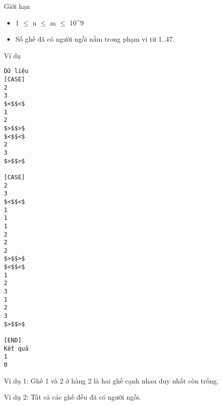 Giới hạn  
\begin{itemize}
	\item     1  $\le$  n  $\le$  m  $\le$  10^9   
	\item     Số ghế đã có người ngồi nằm trong phạm vi từ 1..47.   
\end{itemize}
   Ví dụ  
\begin{verbatim}
Dữ liệu
[CASE]
2
3
$<$$<$
1
2
$>$$>$
$<$$<$
2
3
$>$$>$

[CASE]
2
3
$<$$<$
1
1
1
2
2
2
$>$$>$
$<$$<$
1
2
3
1
2
3
$>$$>$

[END]
Kết quả
1
0
\end{verbatim}

   Ví dụ 1: Ghế 1 và 2 ở hàng 2 là hai ghế cạnh nhau duy nhất còn trống.  

   Ví dụ 2: Tất cả các ghế đều đã có người ngồi.